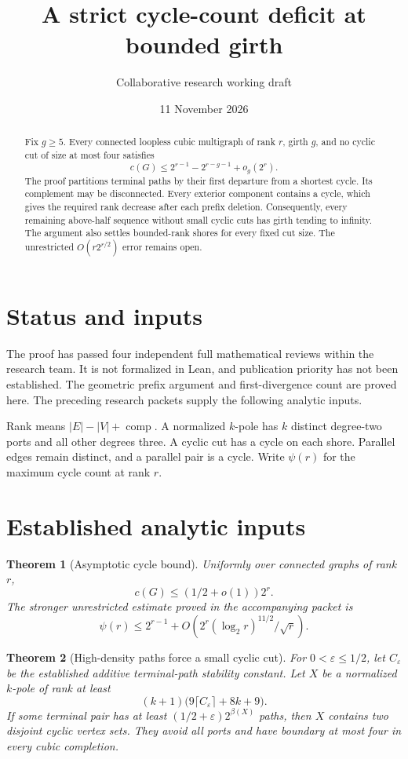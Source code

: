 \documentclass[11pt]{article}
\title{A strict cycle-count deficit at bounded girth}
\author{Collaborative research working draft}
\date{11 November 2026}
\newtheorem{theorem}{Theorem}[section]
\begin{document}
\maketitle
\begin{abstract}
Fix $g\ge5$.
Every connected loopless cubic multigraph of rank $r$, girth $g$, and no cyclic cut of size at most four satisfies
\[
 c(G)\le2^{r-1}-2^{r-g-1}+o_g(2^r).
\]
The proof partitions terminal paths by their first departure from a shortest cycle.
Its complement may be disconnected.
Every exterior component contains a cycle, which gives the required rank decrease after each prefix deletion.
Consequently, every remaining above-half sequence without small cyclic cuts has girth tending to infinity.
The argument also settles bounded-rank shores for every fixed cut size.
The unrestricted $O(r2^{r/2})$ error remains open.
\end{abstract}

\section*{Status and inputs}
The proof has passed four independent full mathematical reviews within the research team.
It is not formalized in Lean, and publication priority has not been established.
The geometric prefix argument and first-divergence count are proved here.
The preceding research packets supply the following analytic inputs.

Rank means $|E|-|V|+\operatorname{comp}$.
A normalized $k$-pole has $k$ distinct degree-two ports and all other degrees three.
A cyclic cut has a cycle on each shore.
Parallel edges remain distinct, and a parallel pair is a cycle.
Write $\psi(r)$ for the maximum cycle count at rank $r$.

\section{Established analytic inputs}
\begin{theorem}[Asymptotic cycle bound]
Uniformly over connected graphs of rank $r$,
\[
 c(G)\le(1/2+o(1))2^r.
\]
The stronger unrestricted estimate proved in the accompanying packet is
\[
 \psi(r)\le2^{r-1}+O\!\left(2^r(\log_2 r)^{11/2}/\sqrt r\right).
\]
\end{theorem}

\begin{theorem}[High-density paths force a small cyclic cut]\label{thm:high-density-pair-small-cyclic-cut}
For $0<\varepsilon\le1/2$, let $C_\varepsilon$ be the established additive terminal-path stability constant.
Let $X$ be a normalized $k$-pole of rank at least
\[
 (k+1)\bigl(9\lceil C_\varepsilon\rceil+8k+9\bigr).
\]
If some terminal pair has at least $(1/2+\varepsilon)2^{\beta(X)}$ paths, then $X$ contains two disjoint cyclic vertex sets.
They avoid all ports and have boundary at most four in every cubic completion.
\end{theorem}
\end{document}
